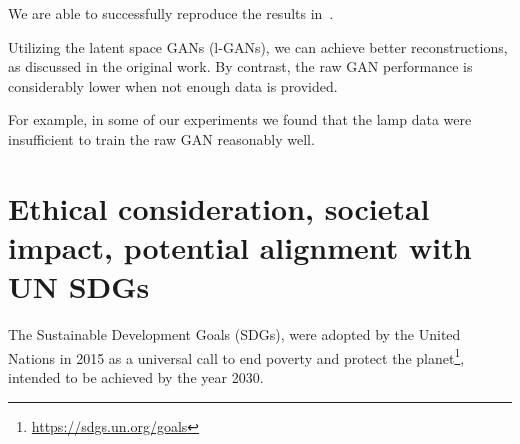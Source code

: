 \documentclass[12pt]{article}
\newcommand{\contentdescription}[1]{}
\begin{document}
    We are able to successfully reproduce the results in~\cite{pmlr-v80-achlioptas18a}.

    Utilizing the latent space GANs (l-GANs), we can achieve better reconstructions, as discussed in the original work.
    By contrast, the raw GAN performance is considerably lower when not enough data is provided.

    For example, in some of our experiments we found that the lamp data were insufficient to train the raw GAN reasonably well.


    \section{Ethical consideration, societal impact, potential alignment with UN SDGs}
    \contentdescription{
        Ethical consideration, societal impact, potential alignment with UN SDGs (5-10\%):
        Think and research!
        Are there any ethical considerations for the original paper, its problem or method, its way of conducting experiments?
        How about your task, your datasets, and the experiments you did?
        What societal impact can you imagine about the original paper and its contributions and results?
        How about your project report?
        How do you think this paper can push the UN SDG targets?
    }

    The Sustainable Development Goals (SDGs), were adopted by the United Nations in 2015 as a universal call
    to end poverty and protect the planet\footnote{\url{https://sdgs.un.org/goals}}, intended to be achieved by the year 2030.
\end{document}
